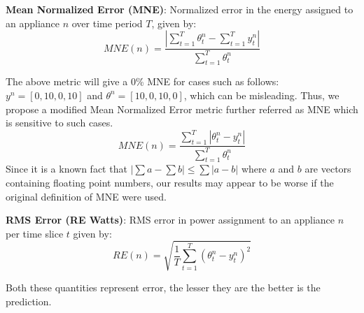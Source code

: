 \documentclass[conference]{IEEEtran}
\begin{document}
\noindent\textbf{Mean Normalized Error (MNE)}: Normalized error in the energy assigned to an appliance $n$ over time period $T$, given by:
\begin{equation}
MNE(n)=\frac{|\sum\limits_{t=1}^{T}\theta_t^n-\sum\limits_{t=1}^{T}y_t^n|}{\sum\limits_{t=1}^{T}\theta_t^n} 
\end{equation} 

\noindent The above metric will give a 0\% MNE for cases such as follows: $y^n=[0,10,0,10]$ and $\theta^n=[10,0,10,0]$, which can be misleading. Thus, we propose a modified Mean Normalized Error metric further referred as MNE which is sensitive to such cases.
\begin{equation}
MNE(n)=\frac{\sum\limits_{t=1}^{T}|\theta_t^n-y_t^n|}{\sum\limits_{t=1}^{T}\theta_t^n} 
\end{equation} 
\noindent Since it is a known fact that $|\sum a-\sum b| \le \sum|a-b|$ where $a$ and $b$ are vectors containing floating point numbers, our results may appear to be worse if the original definition of MNE were used. 

\noindent\textbf{RMS Error (RE Watts)}: RMS error in power assignment to an appliance $n$ per time slice $t$ given by:
\begin{equation}
RE(n)=\sqrt{\frac{1}{T}\sum\limits_{t=1}^{T}(\theta_t^n-y_t^n)^2}
\end{equation}


\noindent Both these quantities represent error, the lesser they are the better is the prediction.

\end{document}
